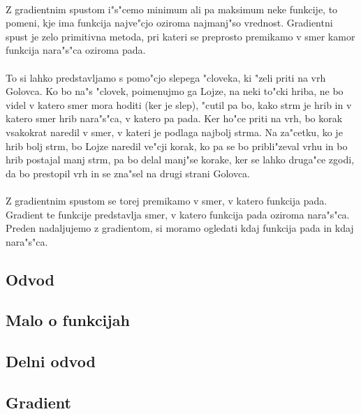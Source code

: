 \paragraph{}
Z gradientnim spustom i"s"cemo minimum ali pa maksimum neke funkcije, to pomeni, kje ima funkcija najve"cjo oziroma najmanj"so vrednost. Gradientni spust je zelo primitivna metoda, pri kateri se preprosto premikamo v smer kamor funkcija nara"s"ca oziroma pada.

\paragraph{}
To si lahko predstavljamo s pomo"cjo slepega "cloveka, ki "zeli priti na vrh Golovca. Ko bo na"s "clovek, poimenujmo ga Lojze, na neki to"cki hriba, ne bo videl v katero smer mora hoditi (ker je slep), "cutil pa bo, kako strm je hrib in v katero smer hrib nara"s"ca, v katero pa pada. Ker ho"ce priti na vrh, bo korak vsakokrat naredil v smer, v kateri je podlaga najbolj strma. Na za"cetku, ko je hrib bolj strm, bo Lojze naredil ve"cji korak, ko pa se bo pribli"zeval vrhu in bo hrib postajal manj strm, pa bo delal manj"se korake, ker se lahko druga"ce zgodi, da bo prestopil vrh in se zna"sel na drugi strani Golovca.

\paragraph{}
Z gradientnim spustom se torej premikamo v smer, v katero funkcija pada. Gradient te funkcije predstavlja smer, v katero funkcija pada oziroma nara"s"ca. Preden nadaljujemo z gradientom, si moramo ogledati kdaj funkcija pada in kdaj nara"s"ca.

\subsection*{Odvod}


\subsection*{Malo o funkcijah}


\subsection*{Delni odvod}


\subsection*{Gradient}


